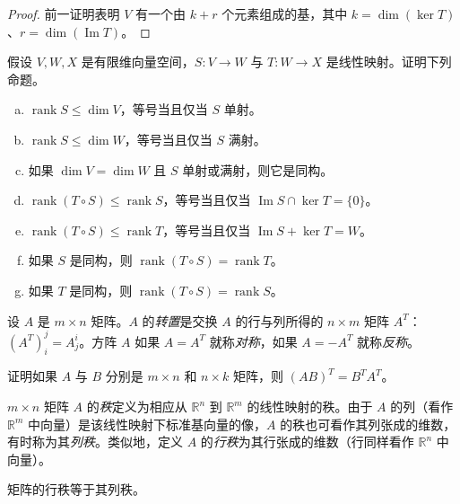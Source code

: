 \documentclass[../../main.tex]{subfiles}
\begin{document}
\begin{proof}
前一证明表明 $V$ 有一个由 $k+r$ 个元素组成的基，其中 $k=\dim(\ker T)$、$r=\dim(\operatorname{Im}T)$。
\end{proof}

\begin{exercise}\label{exercise:appB-B-22}
假设 $V,W,X$ 是有限维向量空间，$S:V\to W$ 与 $T:W\to X$ 是线性映射。证明下列命题。
\begin{enumerate}[(a)]
\item $\operatorname{rank}S\leqslant\dim V$，等号当且仅当 $S$ 单射。
\item $\operatorname{rank}S\leqslant\dim W$，等号当且仅当 $S$ 满射。
\item 如果 $\dim V=\dim W$ 且 $S$ 单射或满射，则它是同构。
\item $\operatorname{rank}(T\circ S)\leqslant\operatorname{rank}S$，等号当且仅当 $\operatorname{Im}S\cap\ker T=\{0\}$。
\item $\operatorname{rank}(T\circ S)\leqslant\operatorname{rank}T$，等号当且仅当 $\operatorname{Im}S+\ker T=W$。
\item 如果 $S$ 是同构，则 $\operatorname{rank}(T\circ S)=\operatorname{rank}T$。
\item 如果 $T$ 是同构，则 $\operatorname{rank}(T\circ S)=\operatorname{rank}S$。
\end{enumerate}
\end{exercise}

设 $A$ 是 $m\times n$ 矩阵。$A$ 的\emph{转置}是交换 $A$ 的行与列所得的 $n\times m$ 矩阵 $A^T$：$(A^T)^j_i=A^i_j$。方阵 $A$ 如果 $A=A^T$ 就称\emph{对称}，如果 $A=-A^T$ 就称\emph{反称}。

\begin{exercise}\label{exercise:appB-B-23}
证明如果 $A$ 与 $B$ 分别是 $m\times n$ 和 $n\times k$ 矩阵，则 $(AB)^T=B^TA^T$。
\end{exercise}

$m\times n$ 矩阵 $A$ 的\emph{秩}定义为相应从 $\mathbb R^n$ 到 $\mathbb R^m$ 的线性映射的秩。由于 $A$ 的列（看作 $\mathbb R^m$ 中向量）是该线性映射下标准基向量的像，$A$ 的秩也可看作其列张成的维数，有时称为其\emph{列秩}。类似地，定义 $A$ 的\emph{行秩}为其行张成的维数（行同样看作 $\mathbb R^n$ 中向量）。

\begin{proposition}\label{proposition:appB-row-column-rank}
矩阵的行秩等于其列秩。
\end{proposition}
\end{document}
